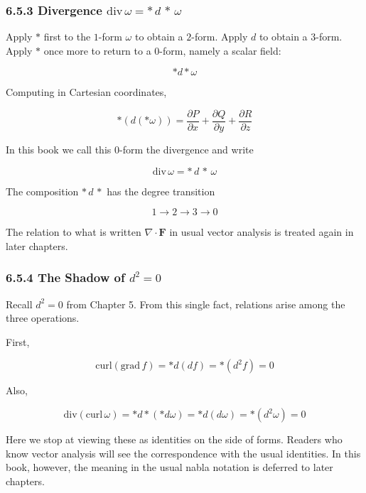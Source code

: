 \hypertarget{divergence-mathrmdivomega-astdastomega}{%
\subsubsection{\texorpdfstring{6.5.3 Divergence
\(\mathrm{div}\,\omega = \ast\,d\,\ast\,\omega\)}{6.5.3 Divergence \textbackslash mathrm\{div\}\textbackslash,\textbackslash omega = \textbackslash ast\textbackslash,d\textbackslash,\textbackslash ast\textbackslash,\textbackslash omega}}\label{divergence-mathrmdivomega-astdastomega}}

Apply \(\ast\) first to the \(1\)-form \(\omega\) to obtain a
\(2\)-form. Apply \(d\) to obtain a \(3\)-form. Apply \(\ast\) once more
to return to a \(0\)-form, namely a scalar field:

\[
\ast d\ast\omega
\]

Computing in Cartesian coordinates,

\[\ast(d(\ast\omega)) = \frac{\partial P}{\partial x} + \frac{\partial Q}{\partial y} + \frac{\partial R}{\partial z}\]

In this book we call this \(0\)-form the divergence and write

\[\mathrm{div}\,\omega = \ast\,d\,\ast\,\omega\]

The composition \(\ast\,d\,\ast\) has the degree transition

\[
1 \to 2 \to 3 \to 0
\]

The relation to what is written \(\nabla\cdot\mathbf F\) in usual vector
analysis is treated again in later chapters.

\hypertarget{the-shadow-of-d2-0}{%
\subsubsection{\texorpdfstring{6.5.4 The Shadow of
\(d^2 = 0\)}{6.5.4 The Shadow of d\^{}2 = 0}}\label{the-shadow-of-d2-0}}

Recall \(d^2 = 0\) from Chapter 5. From this single fact, relations
arise among the three operations.

First,

\[
\mathrm{curl}(\mathrm{grad}\,f)
=
\ast d(df)
=
\ast(d^2 f)
=
0
\]

Also,

\[
\mathrm{div}(\mathrm{curl}\,\omega)
=
\ast d\ast(\ast d\omega)
=
\ast d(d\omega)
=
\ast(d^2\omega)
=
0
\]

Here we stop at viewing these as identities on the side of forms.
Readers who know vector analysis will see the correspondence with the
usual identities. In this book, however, the meaning in the usual nabla
notation is deferred to later chapters.

